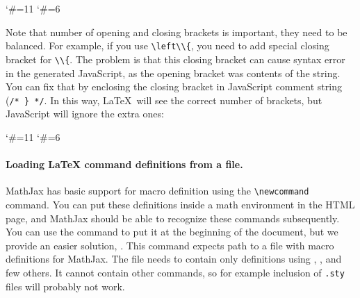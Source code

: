 \begin{texsource}
\catcode`\#=11
\catcode`\#=6

\EndPreamble
\end{texsource}

Note that number of opening and closing brackets is important, they need to be balanced. 
For example, if you use \verb|\left\\{|, you need to add special closing bracket for \verb|\\{|. 
The problem is that this closing bracket can cause syntax error in the generated JavaScript, 
as the opening bracket was contents of the string. You can fix that by enclosing the closing bracket
in JavaScript comment string (\verb|/* } */|. In this way, \LaTeX\ will see the correct number of brackets,
but JavaScript will ignore the extra ones:

\begin{texsource}
\catcode`\#=11
\catcode`\#=6

\EndPreamble
\end{texsource}

\paragraph{Loading \LaTeX{} command definitions from a file.}

MathJax has basic support for macro definition using 
the \verb|\newcommand|  command. You can put these definitions inside a math
environment in the HTML page, and MathJax should be able to recognize
these commands subsequently. You can use the  command
to put it at the beginning of the document, but we provide an easier solution,
. This command expects path to a file with
macro definitions for MathJax. The file needs to contain only definitions using ,
,  and few others. It cannot contain other commands,
so for example inclusion of \texttt{.sty} files will probably not work.

